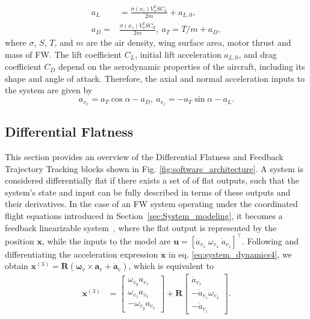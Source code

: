 \begin{align}
a_L &= \frac{\sigma(x_z)V_a^2SC_L}{2m} + a_{L,0}, \\
a_D = &\frac{\sigma(x_z) V_a^2 S C_{d}}{2m},~a_T = T/m + a_D,
\end{align}
where $\sigma$, $S$, $T$, and $m$ are the air density, wing surface area, motor thrust and mass of FW. The lift coefficient $C_L$, initial lift acceleration $a_{L,0}$, and drag coefficient $C_D$ depend on the aerodynamic properties of the aircraft, including its shape and angle of attack. 
Therefore, the axial and normal acceleration inputs to the system are given by
\begin{equation}
    a_{v_x} = a_T \cos{\alpha} - a_D,~a_{v_z} = -a_T \sin{\alpha} - a_L.
\end{equation}


\subsection{Differential Flatness}
\label{sec:differential_flat}

This section provides an overview of the Differential Flatness and Feedback Trajectory Tracking blocks shown in Fig. \ref{fig:software_architecture}. A system is considered differentially flat if there exists a set of of flat outputs, such that the system's state and input can be fully described in terms of these outputs and their derivatives.
In the case of an FW system operating under the coordinated flight equations introduced in Section~\ref{sec:System_modeling}, it becomes a feedback linearizable system~\cite{hauser1997aggressive}, where the flat output is represented by the position $\mathbf{x}$, while the inputs to the model are $\mathbf{u} = [\dot{a}_{v_x}~\omega_{v_x}~\dot{a}_{v_z}]^\top$. 
Following \cite{hauser1997aggressive} and differentiating the acceleration expression $\ddot{\mathbf{x}}$ in eq. \eqref{eq:system_dynamics4}, we obtain $\mathbf{x}^{(3)} = \mathbf{R}(\bm{\omega}_v  \times \mathbf{a}_v + \dot{\mathbf{a}}_v)$, which is equivalent to
\begin{align}
\mathbf{x}^{(3)} &= 
\begin{bmatrix}
\omega_{v_y} a_{v_z} \\
\omega_{v_z} a_{v_x} \\
-\omega_{v_y} a_{v_x}
\end{bmatrix}
+ \mathbf{R}
\begin{bmatrix}
\dot{a}_{v_x} \\
-\dot{a}_{v_z}\omega_{v_x} \\
-\dot{a}_{v_z} 
\end{bmatrix}.
\end{align}

